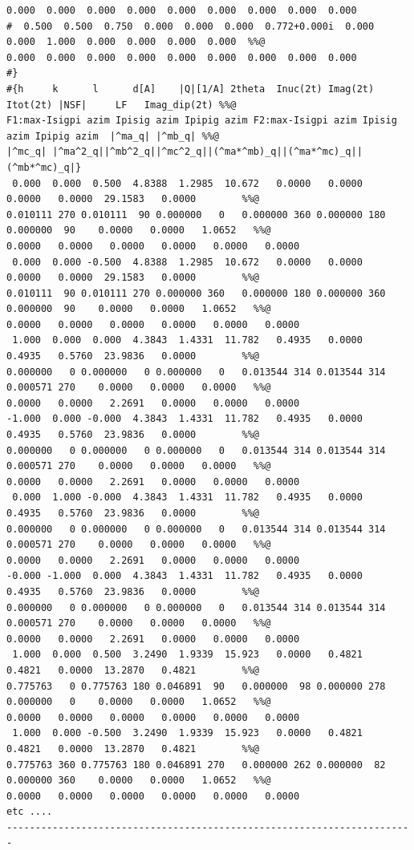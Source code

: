 {\begin{verbatim}
0.000  0.000  0.000  0.000  0.000  0.000  0.000  0.000  0.000 
#  0.500  0.500  0.750  0.000  0.000  0.000  0.772+0.000i  0.000  0.000  1.000  0.000  0.000  0.000  0.000  %%@
0.000  0.000  0.000  0.000  0.000  0.000  0.000  0.000  0.000 
#}
#{h     k      l      d[A]    |Q|[1/A] 2theta  Inuc(2t) Imag(2t) Itot(2t) |NSF|     LF   Imag_dip(2t) %%@
F1:max-Isigpi azim Ipisig azim Ipipig azim F2:max-Isigpi azim Ipisig azim Ipipig azim  |^ma_q| |^mb_q| %%@
|^mc_q| |^ma^2_q||^mb^2_q||^mc^2_q||(^ma*^mb)_q||(^ma*^mc)_q||(^mb*^mc)_q|}
 0.000  0.000  0.500  4.8388  1.2985  10.672   0.0000   0.0000   0.0000   0.0000  29.1583   0.0000        %%@
0.010111 270 0.010111  90 0.000000   0   0.000000 360 0.000000 180 0.000000  90    0.0000   0.0000   1.0652   %%@
0.0000   0.0000   0.0000   0.0000   0.0000   0.0000
 0.000  0.000 -0.500  4.8388  1.2985  10.672   0.0000   0.0000   0.0000   0.0000  29.1583   0.0000        %%@
0.010111  90 0.010111 270 0.000000 360   0.000000 180 0.000000 360 0.000000  90    0.0000   0.0000   1.0652   %%@
0.0000   0.0000   0.0000   0.0000   0.0000   0.0000
 1.000  0.000  0.000  4.3843  1.4331  11.782   0.4935   0.0000   0.4935   0.5760  23.9836   0.0000        %%@
0.000000   0 0.000000   0 0.000000   0   0.013544 314 0.013544 314 0.000571 270    0.0000   0.0000   0.0000   %%@
0.0000   0.0000   2.2691   0.0000   0.0000   0.0000
-1.000  0.000 -0.000  4.3843  1.4331  11.782   0.4935   0.0000   0.4935   0.5760  23.9836   0.0000        %%@
0.000000   0 0.000000   0 0.000000   0   0.013544 314 0.013544 314 0.000571 270    0.0000   0.0000   0.0000   %%@
0.0000   0.0000   2.2691   0.0000   0.0000   0.0000
 0.000  1.000 -0.000  4.3843  1.4331  11.782   0.4935   0.0000   0.4935   0.5760  23.9836   0.0000        %%@
0.000000   0 0.000000   0 0.000000   0   0.013544 314 0.013544 314 0.000571 270    0.0000   0.0000   0.0000   %%@
0.0000   0.0000   2.2691   0.0000   0.0000   0.0000
-0.000 -1.000  0.000  4.3843  1.4331  11.782   0.4935   0.0000   0.4935   0.5760  23.9836   0.0000        %%@
0.000000   0 0.000000   0 0.000000   0   0.013544 314 0.013544 314 0.000571 270    0.0000   0.0000   0.0000   %%@
0.0000   0.0000   2.2691   0.0000   0.0000   0.0000
 1.000  0.000  0.500  3.2490  1.9339  15.923   0.0000   0.4821   0.4821   0.0000  13.2870   0.4821        %%@
0.775763   0 0.775763 180 0.046891  90   0.000000  98 0.000000 278 0.000000   0    0.0000   0.0000   1.0652   %%@
0.0000   0.0000   0.0000   0.0000   0.0000   0.0000
 1.000  0.000 -0.500  3.2490  1.9339  15.923   0.0000   0.4821   0.4821   0.0000  13.2870   0.4821        %%@
0.775763 360 0.775763 180 0.046891 270   0.000000 262 0.000000  82 0.000000 360    0.0000   0.0000   1.0652   %%@
0.0000   0.0000   0.0000   0.0000   0.0000   0.0000
etc ....
-----------------------------------------------------------------------
\end{verbatim}
}

